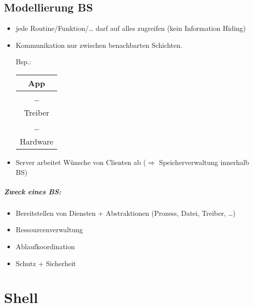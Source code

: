 \section{Modellierung BS}
\begin{itemize}
\item {} jede Routine/Funktion/… darf auf alles zugreifen (kein Information Hiding)
\item {} Kommunikation nur zwischen benachbarten Schichten.

Bsp.: \begin{tabular}{|c|}
\hline
App\\
\hline
…\\
\hline
Treiber\\
\hline
…\\
\hline
Hardware\\
\hline
\end{tabular}
\item {} Server arbeitet Wünsche von Clienten ab ($\Rightarrow$ Speicherverwaltung innerhalb BS)
\end{itemize}


\paragraph{Zweck eines BS:}
\begin{itemize}
\item Bereitstellen von Diensten + Abstraktionen (Prozess, Datei, Treiber, …)
\item Ressourcenverwaltung
\item Ablaufkoordination
\item Schutz + Sicherheit
\end{itemize}

\chapter{Shell}

